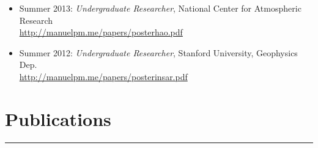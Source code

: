 \documentclass[letterpaper,10pt]{article}
\begin{document}
\begin{itemize}[label=$\blacktriangleright$]
  \item Summer 2013: \emph{Undergraduate Researcher}, National Center for Atmospheric Research \\
\url{http://manuelpm.me/papers/posterhao.pdf}
  \end{itemize}

\begin{itemize}[label=$\blacktriangleright$]
  \item Summer 2012: \emph{Undergraduate Researcher}, Stanford University, Geophysics Dep.\ \\
\url{http://manuelpm.me/papers/posterinsar.pdf} 
  \end{itemize}

\section*{Publications }%
\hrule
\vspace{.3 cm}
\end{document}
